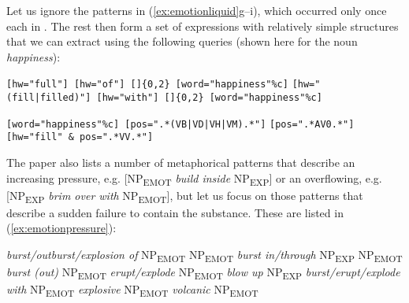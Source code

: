 Let us ignore the patterns in (\ref{ex:emotionliquid}g--i),  which occurred only once each in \citet{stefanowitsch_words_2006}. The rest then form a set of expressions with relatively simple structures that we can extract  using the following queries (shown here for the noun  \textit{happiness}):

\begin{exe}
\ex
\begin{xlist}
\label{ex:emotionliquidquery}
\ex \texttt{[hw="full"] [hw="of"] []\{0,2\} [word="happiness"\%c]}
\ex \texttt{[hw="(fill|filled)"] [hw="with"] []\{0,2\} [word="happiness"\%c]}
\ex \begin{minipage}[t]{0.85\textwidth} \raggedright \texttt{[word="happiness"\%c] [pos=".*(VB|VD|VH|VM).*"]} \texttt{[pos=".*AV0.*"] [hw="fill" \& pos=".*VV.*"]} \end{minipage}
\end{xlist}
\end{exe}

The paper also lists a number of metaphorical  patterns that describe an increasing pressure, e.g. [NP\textsubscript{EMOT} \textit{build inside} NP\textsubscript{EXP}] or an overflowing, e.g. [NP\textsubscript{EXP} \textit{brim over with} NP\textsubscript{EMOT}], but let us focus on those patterns that describe a sudden failure to contain the substance. These are listed in  (\ref{ex:emotionpressure}):

\begin{exe}
\ex
\begin{xlist}
\label{ex:emotionpressure}
\ex \textit{burst\slash outburst\slash explosion of} NP\textsubscript{EMOT}
\ex NP\textsubscript{EMOT} \textit{burst in\slash through} NP\textsubscript{EXP}
\ex NP\textsubscript{EMOT} \textit{burst (out)}
\ex NP\textsubscript{EMOT} \textit{erupt\slash explode}
\ex NP\textsubscript{EMOT} \textit{blow up}
\ex NP\textsubscript{EXP} \textit{burst\slash erupt\slash explode with} NP\textsubscript{EMOT}
\ex \textit{explosive} NP\textsubscript{EMOT}
\ex \textit{volcanic} NP\textsubscript{EMOT}
\end{xlist}
\end{exe}

